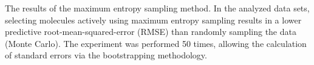The results of the maximum entropy sampling method.  In the analyzed data sets, selecting molecules actively using maximum entropy sampling results in a lower predictive root-mean-squared-error (RMSE) than randomly sampling the data (Monte Carlo). The experiment was performed 50 times, allowing the calculation of standard errors via the bootstrapping methodology.\label{fig:max_entropy}